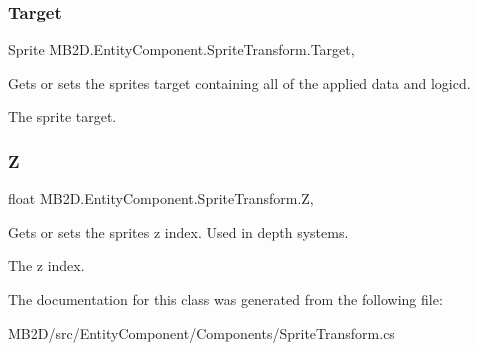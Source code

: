 \subsubsection{\texorpdfstring{Target}{Target}}
{\footnotesize\ttfamily Sprite M\+B2\+D.\+Entity\+Component.\+Sprite\+Transform.\+Target\hspace{0.3cm}{\ttfamily [get]}, {\ttfamily [set]}}



Gets or sets the sprites target containing all of the applied data and logicd. 

The sprite target.\hypertarget{class_m_b2_d_1_1_entity_component_1_1_sprite_transform_a312bac0f6e60d258adce879f4d3da2e7}{}\label{class_m_b2_d_1_1_entity_component_1_1_sprite_transform_a312bac0f6e60d258adce879f4d3da2e7} 
\subsubsection{\texorpdfstring{Z}{Z}}
{\footnotesize\ttfamily float M\+B2\+D.\+Entity\+Component.\+Sprite\+Transform.\+Z\hspace{0.3cm}{\ttfamily [get]}, {\ttfamily [set]}}



Gets or sets the sprites z index. Used in depth systems. 

The z index.

The documentation for this class was generated from the following file\+:\begin{DoxyCompactItemize}
\item 
M\+B2\+D/src/\+Entity\+Component/\+Components/Sprite\+Transform.\+cs\end{DoxyCompactItemize}
